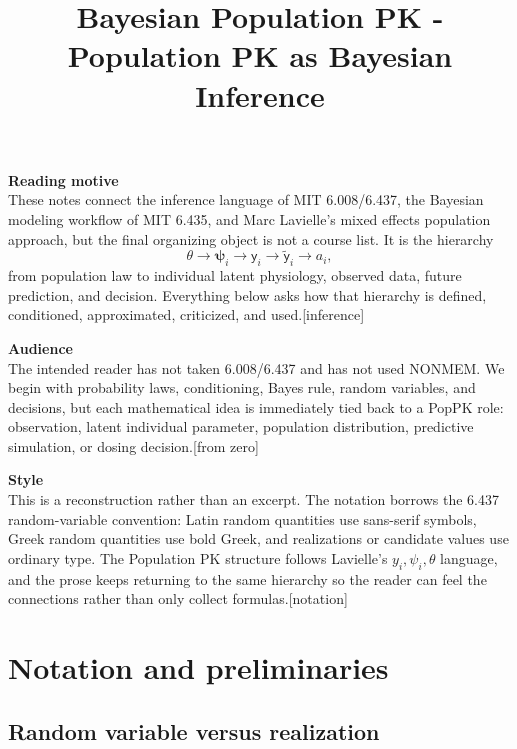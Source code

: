 \documentclass[a4paper]{article}
\title{Bayesian Population PK - Population PK as Bayesian Inference}
\newcommand{\rv}[1]{\mathsf{#1}}
\newcommand{\rpsi}{\boldsymbol{\psi}}
\begin{document}
\maketitle
{\small
  \noindent\textbf{Reading motive}\\
  These notes connect the inference language of MIT 6.008/6.437, the Bayesian modeling workflow of MIT 6.435, and Marc Lavielle's mixed effects population approach, but the final organizing object is not a course list.  It is the hierarchy
  \[
    \theta
    \longrightarrow
    \rpsi_i
    \longrightarrow
    \rv{y}_i
    \longrightarrow
    \tilde{\rv{y}}_i
    \longrightarrow
    a_i,
  \]
  from population law to individual latent physiology, observed data, future prediction, and decision.  Everything below asks how that hierarchy is defined, conditioned, approximated, criticized, and used.\hspace*{\fill}[inference]

  \vspace{5pt}
  \noindent\textbf{Audience}\\
  The intended reader has not taken 6.008/6.437 and has not used NONMEM.  We begin with probability laws, conditioning, Bayes rule, random variables, and decisions, but each mathematical idea is immediately tied back to a PopPK role: observation, latent individual parameter, population distribution, predictive simulation, or dosing decision.\hspace*{\fill}[from zero]

  \vspace{5pt}
  \noindent\textbf{Style}\\
  This is a reconstruction rather than an excerpt. The notation borrows the 6.437 random-variable convention: Latin random quantities use sans-serif symbols, Greek random quantities use bold Greek, and realizations or candidate values use ordinary type. The Population PK structure follows Lavielle's \(y_i,\psi_i,\theta\) language, and the prose keeps returning to the same hierarchy so the reader can feel the connections rather than only collect formulas.\hspace*{\fill}[notation]
}

\tableofcontents

\section{Notation and preliminaries}

\subsection{Random variable versus realization}
\end{document}
